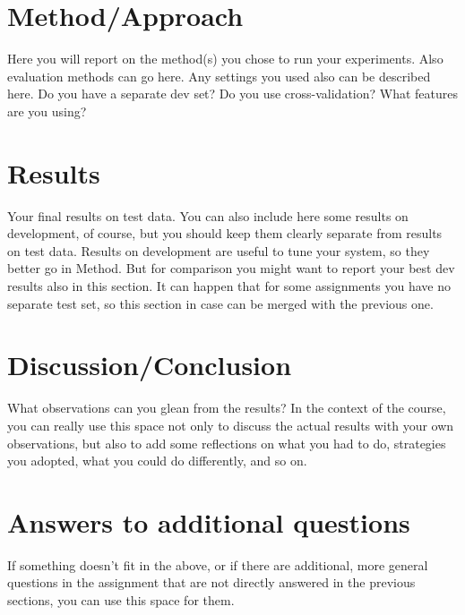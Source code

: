 \documentclass[11pt]{article}
\begin{document}
\section{Method/Approach}

Here you will report on the method(s) you chose to run your experiments. Also evaluation methods can go here. Any settings you used also can be described here. Do you have a separate dev set? Do you use cross-validation? What features are you using?

\section{Results}

Your final results on test data. You can also include here some results on development, of course, but you should keep them clearly separate from results on test data. Results on development are useful to tune your system, so they better go in Method. But for comparison you might want to report your best dev results also in this section. It can happen that for some assignments you have no separate test set, so this section in case can be merged with the previous one.

\section{Discussion/Conclusion}

What observations can you glean from the results? In the context of the course, you can really use this space not only to discuss the actual results with your own observations, but also to add some reflections on what you had to do, strategies you adopted, what you could do differently, and so on.

\section{Answers to additional questions}

If something doesn't fit in the above, or if there are additional, more general questions in the assignment that are not directly answered in the previous sections, you can use this space for them.




\end{document}
